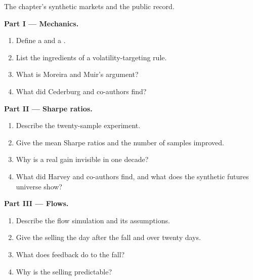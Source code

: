 \begin{problem}\label{pb:s1:volatility-targeting-and-risk-managed-portfolios:1}
The chapter's synthetic markets and the public record.

\medskip\noindent\textbf{Part I --- Mechanics.}
\begin{enumerate}
\item Define a  and a .
\item List the ingredients of a volatility-targeting rule.
\item What is Moreira and Muir's argument?
\item What did Cederburg and co-authors find?
\end{enumerate}

\medskip\noindent\textbf{Part II --- Sharpe ratios.}
\begin{enumerate}[resume]
\item Describe the twenty-sample experiment.
\item Give the mean Sharpe ratios and the number of samples improved.
\item Why is a real gain invisible in one decade?
\item What did Harvey and co-authors find, and what does the synthetic futures universe show?
\end{enumerate}

\medskip\noindent\textbf{Part III --- Flows.}
\begin{enumerate}[resume]
\item Describe the flow simulation and its assumptions.
\item Give the selling the day after the fall and over twenty days.
\item What does feedback do to the fall?
\item Why is the selling predictable?
\end{enumerate}


\end{problem}
